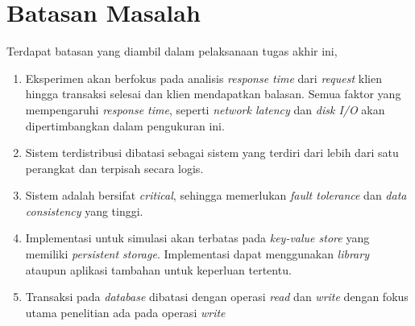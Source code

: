 \section{Batasan Masalah}
\label{sec:batasan-masalah}

Terdapat batasan yang diambil dalam pelaksanaan tugas akhir ini,

\begin{enumerate}
    \item Eksperimen akan berfokus pada analisis \textit{response time} dari \textit{request} klien hingga transaksi selesai dan klien mendapatkan balasan. Semua faktor yang mempengaruhi \textit{response time}, seperti \textit{network latency} dan \textit{disk I/O} akan dipertimbangkan dalam pengukuran ini.
    \item Sistem terdistribusi dibatasi sebagai sistem yang terdiri dari lebih dari satu perangkat dan terpisah secara logis.
    \item Sistem adalah bersifat \textit{critical}, sehingga memerlukan \textit{fault tolerance} dan \textit{data consistency} yang tinggi.
    \item Implementasi untuk simulasi akan terbatas pada \textit{key-value store} yang memiliki \textit{persistent storage}. Implementasi dapat menggunakan \textit{library} ataupun aplikasi tambahan untuk keperluan tertentu.
    \item Transaksi pada \textit{database} dibatasi dengan operasi \textit{read} dan \textit{write} dengan fokus utama penelitian ada pada operasi \textit{write} 
\end{enumerate}
